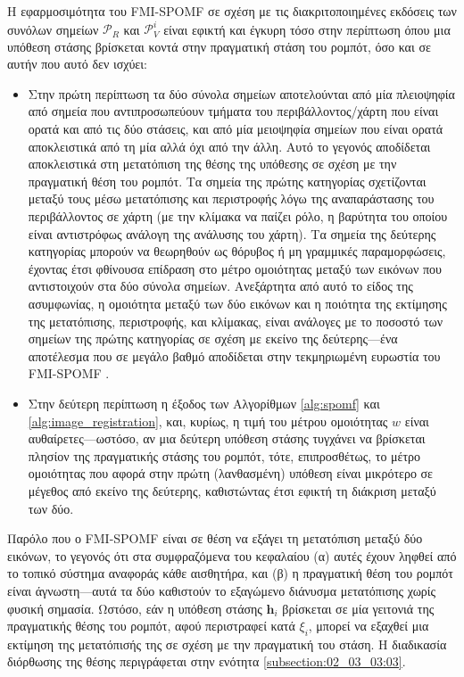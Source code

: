 Η εφαρμοσιμότητα του FMI-SPOMF σε σχέση με τις διακριτοποιημένες εκδόσεις των
συνόλων σημείων $\mathcal{P}_R$ και $\mathcal{P}_V^i$ είναι εφικτή και
έγκυρη τόσο στην περίπτωση όπου μια υπόθεση στάσης βρίσκεται κοντά στην
πραγματική στάση του ρομπότ, όσο και σε αυτήν που αυτό δεν ισχύει:

\begin{itemize}
  \item Στην πρώτη περίπτωση τα δύο σύνολα σημείων αποτελούνται
        από μία πλειοψηφία από σημεία που αντιπροσωπεύουν τμήματα του
        περιβάλλοντος/χάρτη που είναι ορατά και από τις δύο στάσεις, και από μία
        μειοψηφία σημείων που είναι ορατά αποκλειστικά από τη μία αλλά όχι από
        την άλλη. Αυτό το γεγονός αποδίδεται αποκλειστικά στη μετατόπιση της
        θέσης της υπόθεσης σε σχέση με την πραγματική θέση του ρομπότ. Τα
        σημεία της πρώτης κατηγορίας σχετίζονται μεταξύ τους μέσω
        μετατόπισης και περιστροφής λόγω της αναπαράστασης του περιβάλλοντος
        σε χάρτη (με την κλίμακα να παίζει ρόλο, η βαρύτητα του οποίου είναι
        αντιστρόφως ανάλογη της ανάλυσης του χάρτη). Τα σημεία της
        δεύτερης κατηγορίας μπορούν να θεωρηθούν ως θόρυβος ή μη γραμμικές
        παραμορφώσεις, έχοντας έτσι φθίνουσα επίδραση στο μέτρο ομοιότητας
        μεταξύ των εικόνων που αντιστοιχούν στα δύο σύνολα σημείων. Ανεξάρτητα
        από αυτό το είδος της ασυμφωνίας, η ομοιότητα μεταξύ των δύο εικόνων
        και η ποιότητα της εκτίμησης της μετατόπισης, περιστροφής, και κλίμακας,
        είναι ανάλογες με το ποσοστό των σημείων της πρώτης κατηγορίας σε
        σχέση με εκείνο της δεύτερης---ένα αποτέλεσμα που σε μεγάλο βαθμό
        αποδίδεται στην τεκμηριωμένη ευρωστία του FMI-SPOMF
        \cite{Qin-ShengChen1994a}.
  \item Στην δεύτερη περίπτωση η έξοδος των Αλγορίθμων \ref{alg:spomf} και
        \ref{alg:image_registration}, και, κυρίως, η τιμή του μέτρου ομοιότητας
        $w$ είναι αυθαίρετες---ωστόσο, αν μια δεύτερη υπόθεση στάσης τυγχάνει να
        βρίσκεται πλησίον της πραγματικής στάσης του ρομπότ, τότε, επιπροσθέτως,
        το μέτρο ομοιότητας που αφορά στην πρώτη (λανθασμένη) υπόθεση είναι
        μικρότερο σε μέγεθος από εκείνο της δεύτερης, καθιστώντας έτσι εφικτή
        τη διάκριση μεταξύ των δύο.
\end{itemize}

Παρόλο που ο FMI-SPOMF είναι σε θέση να εξάγει τη μετατόπιση μεταξύ δύο
εικόνων, το γεγονός ότι στα συμφραζόμενα του κεφαλαίου (α) αυτές έχουν ληφθεί
από το τοπικό σύστημα αναφοράς κάθε αισθητήρα, και (β) η πραγματική θέση του
ρομπότ είναι άγνωστη---αυτά τα δύο καθιστούν το εξαγώμενο διάνυσμα μετατόπισης
χωρίς φυσική σημασία. Ωστόσο, εάν η υπόθεση στάσης $\bm{h}_i$ βρίσκεται σε μία
γειτονιά της πραγματικής θέσης του ρομπότ, αφού περιστραφεί κατά
$\xi_i$, μπορεί να εξαχθεί μια εκτίμηση της μετατόπισής της σε σχέση με την
πραγματική του στάση. Η διαδικασία διόρθωσης της θέσης περιγράφεται στην ενότητα
\ref{subsection:02_03_03:03}.


